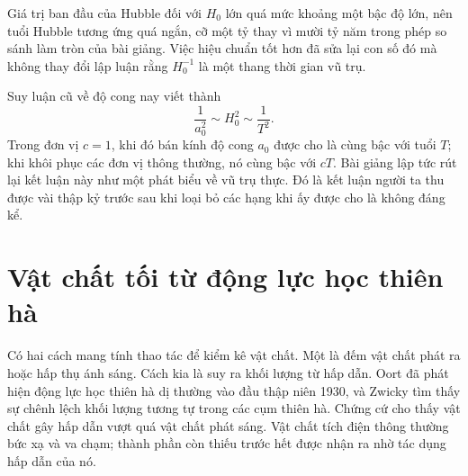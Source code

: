 \begin{classroomqa}
\end{classroomqa}

Giá trị ban đầu của Hubble đối với \(H_0\) lớn quá mức khoảng một bậc độ lớn, nên tuổi Hubble tương ứng quá ngắn, cỡ một tỷ thay vì mười tỷ năm trong phép so sánh làm tròn của bài giảng. Việc hiệu chuẩn tốt hơn đã sửa lại con số đó mà không thay đổi lập luận rằng \(H_0^{-1}\) là một thang thời gian vũ trụ.

Suy luận cũ về độ cong nay viết thành
\begin{equation}
\frac{1}{a_0^2}\sim H_0^2\sim\frac{1}{T^2}.
\end{equation}
Trong đơn vị \(c=1\), khi đó bán kính độ cong \(a_0\) được cho là cùng bậc với tuổi \(T\); khi khôi phục các đơn vị thông thường, nó cùng bậc với \(cT\). Bài giảng lập tức rút lại kết luận này như một phát biểu về vũ trụ thực. Đó là kết luận người ta thu được vài thập kỷ trước sau khi loại bỏ các hạng khi ấy được cho là không đáng kể.

\begin{classroomqa}
\end{classroomqa}

\section{Vật chất tối từ động lực học thiên hà}

Có hai cách mang tính thao tác để kiểm kê vật chất. Một là đếm vật chất phát ra hoặc hấp thụ ánh sáng. Cách kia là suy ra khối lượng từ hấp dẫn. Oort đã phát hiện động lực học thiên hà dị thường vào đầu thập niên 1930, và Zwicky tìm thấy sự chênh lệch khối lượng tương tự trong các cụm thiên hà. Chứng cứ cho thấy vật chất gây hấp dẫn vượt quá vật chất phát sáng. Vật chất tích điện thông thường bức xạ và va chạm; thành phần còn thiếu trước hết được nhận ra nhờ tác dụng hấp dẫn của nó.

